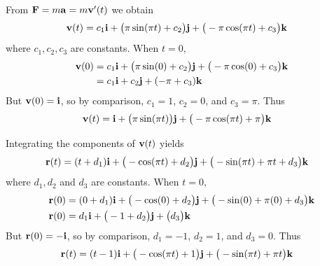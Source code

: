 %
\item 
\BEN
\item 
From $\mathbf{F}=m\mathbf{a} = m\mathbf{v}'(t)$ we obtain
\begin{align*}
  \mathbf{v}(t) &= c_1\mathbf{i}+ \big(\pi\sin(\pi t)+c_2\big)\mathbf{j} + \big(- \pi \cos(\pi t) + c_3\big) \mathbf{k}
\end{align*}
where $c_1,c_2,c_3$ are constants. When $t=0$,  
\begin{align*}
  \mathbf{v}(0) &= c_1\mathbf{i}+ \big(\pi\sin(0)+c_2\big)\mathbf{j} + \big(- \pi \cos(0) + c_3\big) \mathbf{k}\\
  &= c_1\mathbf{i}+c_2\mathbf{j} + ( -\pi + c_3) \mathbf{k}
\end{align*}
But $\mathbf{v}(0) = \mathbf{i}$, so by comparison, $c_1= 1$, $c_2 = 0$, and $c_3=\pi$. Thus
\begin{align*}
  \mathbf{v}(t) &= \mathbf{i}+ \big(\pi\sin(\pi t)\big)\mathbf{j} + \big(- \pi \cos(\pi t) + \pi\big) \mathbf{k}
\end{align*}
\item Integrating the components of $\mathbf{v}(t)$ yields
\begin{align*}
  \mathbf{r}(t) &= (t+d_1)\mathbf{i}+ \big(-\cos(\pi t)+d_2\big)\mathbf{j} + \big(- \sin(\pi t) + \pi t + d_3\big) \mathbf{k}
\end{align*}
where $d_1,d_2$ and $d_3$ are constants. When $t=0$,  
\begin{align*}
  \mathbf{r}(0) &= (0+d_1)\mathbf{i}+ \big(-\cos(0)+d_2\big)\mathbf{j} + \big(- \sin(0) + \pi (0) + d_3\big) \mathbf{k} \\
  \mathbf{r}(0) &= d_1\mathbf{i}+ \big(-1+d_2\big)\mathbf{j} + \big(d_3\big) \mathbf{k}
\end{align*}
But $\mathbf{r}(0) = -\mathbf{i}$, so by comparison, $d_1= -1$, $d_2 = 1$, and $d_3=0$. Thus
\begin{align*}
  \mathbf{r}(t) &= (t-1)\mathbf{i}+ \big(-\cos(\pi t)+1\big)\mathbf{j} + \big(- \sin(\pi t) + \pi t\big) \mathbf{k}
\end{align*}

